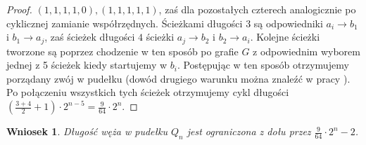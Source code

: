 \documentclass{pracamgr}
\newtheorem{corollary}[theorem]{Wniosek}
\begin{document}
\begin{proof}
      $(1,1,1,1,0),(1,1,1,1,1)$, zaś dla pozostałych czterech
      analogicznie po cyklicznej zamianie współrzędnych.
      Ścieżkami długości $3$ są odpowiedniki $a_i\rightarrow b_1$ i $b_1\rightarrow a_j$, zaś ścieżek długości $4$ ścieżki
      $a_j\rightarrow b_2$ i $b_2\rightarrow a_i$. Kolejne ścieżki tworzone są poprzez chodzenie w ten sposób po grafie $G$ z odpowiednim
      wyborem jednej z 5 ścieżek kiedy startujemy w $b_i$.
      Postępując w ten sposób otrzymujemy porządany zwój w pudełku (dowód drugiego warunku można znaleźć w pracy \cite{Snake2}).
      Po połączeniu wszystkich tych ścieżek otrzymujemy cykl długości $(\frac{3+4}{2}+1)\cdot 2^{n-5}=\frac{9}{64}\cdot2^n$.
     \end{proof} 
     \begin{corollary}
      Długość węża w pudełku $Q_n$ jest ograniczona z dołu przez $\frac{9}{64}\cdot 2^n-2$.
     \end{corollary}
\end{document}
